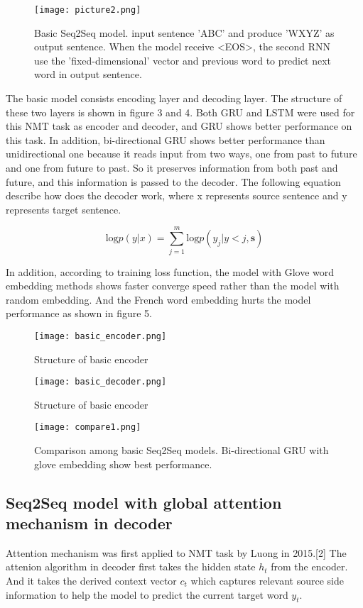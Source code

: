 \documentclass{article}
\begin{document}
\begin{figure}[h]
  \centering
  \texttt{[image: picture2.png]}
  \caption{Basic Seq2Seq model. input sentence 'ABC' and produce 'WXYZ' as output sentence. When the model receive <EOS>, the second RNN use the 'fixed-dimensional' vector and previous word to predict next word in output sentence.}
\end{figure}

The basic model consists encoding layer and decoding layer. The structure of these two layers is shown in figure 3 and 4. Both GRU and LSTM were used for this NMT task as encoder and decoder, and GRU shows better performance on this task. In addition, bi-directional GRU shows better performance than unidirectional one because it reads input from two ways, one from past to future and one from future to past. So it preserves information from both past and future, and this information is passed to the decoder. The following equation describe how does the decoder work, where x represents source sentence and y represents target sentence.

\[\textrm{log} p(y|x) = \sum_{j=1}^{m}{\textrm{log} p(y_j|y<j,\textbf{s})} \]

In addition, according to training loss function, the model with Glove word embedding methods shows faster converge speed rather than the model with random embedding. And the French word embedding hurts the model performance as shown in figure 5.

\begin{figure}[h]
\centering
\begin{minipage}{.5\textwidth}
  \centering
  \texttt{[image: basic\_encoder.png]}
  \caption{Structure of basic encoder}{}
  \label{fig:test1}
\end{minipage}%
\begin{minipage}{.5\textwidth}
  \centering
  \texttt{[image: basic\_decoder.png]}
  \caption{Structure of basic encoder}{}
  \label{fig:test2}
\end{minipage}
\end{figure}

\begin{figure}[h]
  \centering
  \texttt{[image: compare1.png]}
  \caption{Comparison among basic Seq2Seq models. Bi-directional GRU with glove embedding show best performance.}
\end{figure}
\subsection{Seq2Seq model with global attention mechanism in decoder}
Attention mechanism was first applied to NMT task by Luong in 2015.[2] The attenion algorithm in decoder first takes the hidden state $h_t$ from the encoder. And it takes the derived context vector $c_t$ which captures relevant source side information to help the model to predict the current target word $y_t$.  
\end{document}
